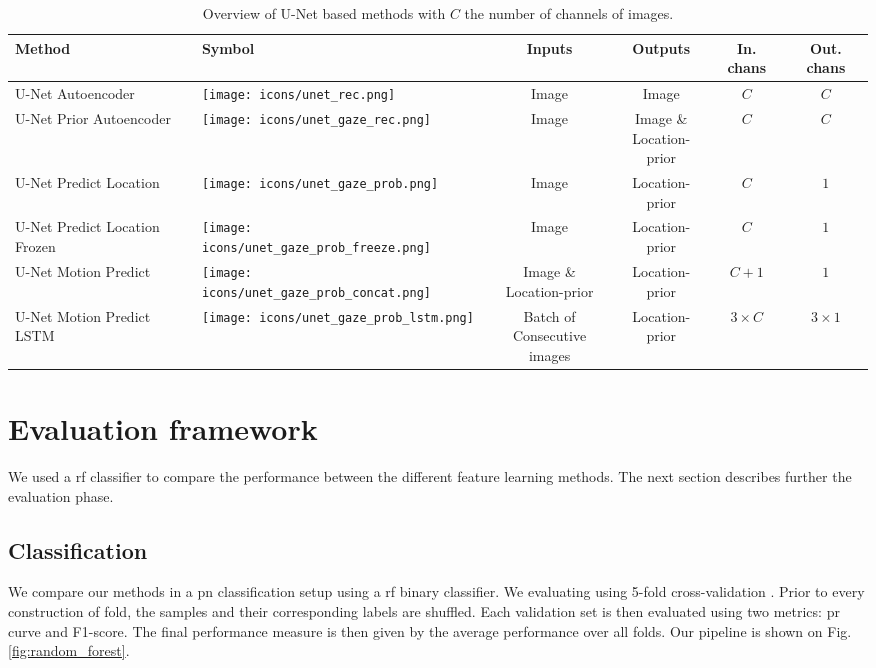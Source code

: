 \begin{table}[!htbp]
   \centering
   \caption[U-Net based method overview]{Overview of U-Net based methods with $C$ the number of channels of images.}
   \begin{tabular}{l|m{1.3cm}|c|c|c|c}
      \toprule
      \textbf{Method} & \textbf{Symbol} & \textbf{Inputs} & \textbf{Outputs} & \textbf{In. chans} & \textbf{Out. chans} \\
      \midrule
      U-Net Autoencoder & \texttt{[image: icons/unet\_rec.png]} & Image & Image & $C$ & $C$ \\
      \midrule
      U-Net Prior Autoencoder & \texttt{[image: icons/unet\_gaze\_rec.png]} & Image & \specialcell{Image \& \\Location-prior} & $C$ & $C$ \\
      \midrule
      U-Net Predict Location & \texttt{[image: icons/unet\_gaze\_prob.png]} & Image & Location-prior & $C$ & $1$ \\
      \midrule
      U-Net Predict Location Frozen & \texttt{[image: icons/unet\_gaze\_prob\_freeze.png]} & Image & Location-prior & $C$ & $1$ \\
      \midrule
      U-Net Motion Predict & \texttt{[image: icons/unet\_gaze\_prob\_concat.png]} & \specialcell{Image \& \\Location-prior} & Location-prior & $C+1$ & $1$ \\
       \midrule
      U-Net Motion Predict LSTM & \texttt{[image: icons/unet\_gaze\_prob\_lstm.png]} & \specialcell{Batch of \\ Consecutive images} & Location-prior & $3 \times C$ & $3 \times 1$ \\
      \bottomrule
   \end{tabular}
   \label{tab:summary_unet_methods}
\end{table}


\section{Evaluation framework}
We used a \gls{rf} classifier to compare the performance between the different feature learning methods.
The next section describes further the evaluation phase.

\subsection{Classification} \label{random_forest}
We compare our methods in a \gls{pn} classification setup using a \gls{rf} binary classifier.
We evaluating using 5-fold cross-validation \cite[p. 241]{hastie09}.
Prior to every construction of fold, the samples and their corresponding labels are shuffled.
Each validation set is then evaluated using two metrics: \gls{pr} curve and F1-score.
The final performance measure is then given by the average performance over all folds.
Our pipeline is shown on Fig. \ref{fig:random_forest}.

